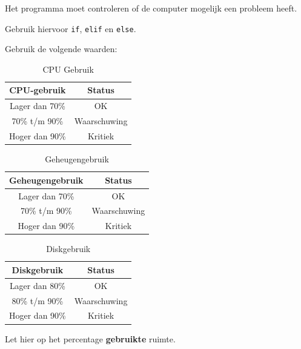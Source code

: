 Het programma moet controleren of de computer mogelijk een probleem heeft.

Gebruik hiervoor \texttt{if}, \texttt{elif} en \texttt{else}.

Gebruik de volgende waarden:

\begin{table}[!h]
\begin{center}
\caption{CPU Gebruik}
\label{table-cpu}
\begin{tabular}{| c | c |} 
\hline
CPU-gebruik & Status \\
\hline
Lager dan 70\% & OK \\ 
\hline
70\% t/m 90\% & Waarschuwing \\
\hline
Hoger dan 90\% & Kritiek \\
\hline
\end{tabular}
\end{center}
\end{table}

\begin{table}[!h]
\begin{center}
\caption{Geheugengebruik}
\label{table-mem}
\begin{tabular}{| c | c |} 
\hline
Geheugengebruik & Status \\
\hline
Lager dan 70\% & OK \\ 
\hline
70\% t/m 90\% & Waarschuwing \\
\hline
Hoger dan 90\% & Kritiek \\
\hline
\end{tabular}
\end{center}
\end{table}


\begin{table}[!h]
\begin{center}
\caption{Diskgebruik}
\label{table-dsk}
\begin{tabular}{| c | c |} 
\hline
Diskgebruik & Status \\
\hline
Lager dan 80\% & OK \\ 
\hline
80\% t/m 90\% & Waarschuwing \\
\hline
Hoger dan 90\% & Kritiek \\
\hline
\end{tabular}
\end{center}
\end{table}

Let hier op het percentage \textbf{gebruikte} ruimte.

